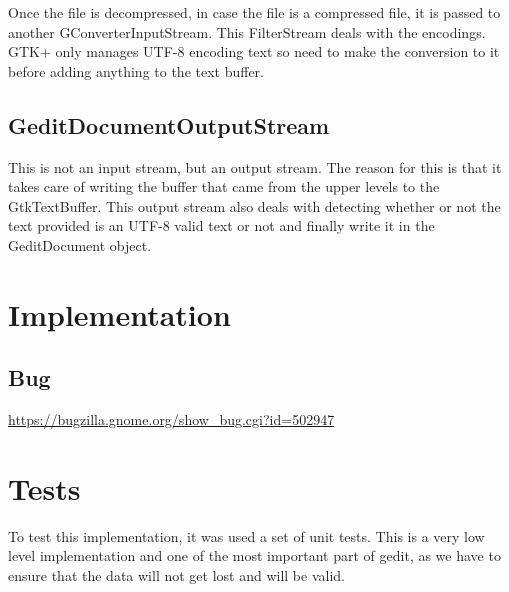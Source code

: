 Once the file is decompressed, in case the file is a compressed file, it is passed to another GConverterInputStream. This FilterStream deals with the encodings. GTK+ only manages UTF-8 encoding text so need to make the conversion to it before adding anything to the text buffer.

\subsection*{GeditDocumentOutputStream}

This is not an input stream, but an output stream. The reason for this is that it takes care of writing the buffer that came from the upper levels to the GtkTextBuffer. This output stream also deals with detecting whether or not the text provided is an UTF-8 valid text or not and finally write it in the GeditDocument object.

\section{Implementation}

\subsection{Bug}

\noindent\url{https://bugzilla.gnome.org/show_bug.cgi?id=502947}

\section{Tests}

To test this implementation, it was used a set of unit tests. This is a very low level implementation and one of the most important part of gedit, as we have to ensure that the data will not get lost and will be valid.


